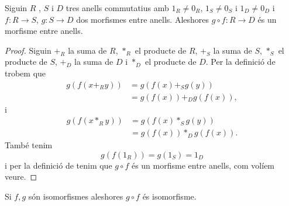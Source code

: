 \documentclass[../../Main.tex]{subfiles}
\begin{document}
	\begin{proposition}
		\label{prop:operació morfismes entre anells és morfisme entre anells}
		Siguin \(R\) , \(S\) i \(D\) tres anells commutatius amb \(1_{R}\neq0_{R}\), \(1_{S}\neq0_{S}\) i \(1_{D}\neq0_{D}\) i \(f\colon R\longrightarrow S\), \(g\colon S\longrightarrow D\) dos morfismes entre anells.
		Aleshores \(g\circ f\colon R\longrightarrow D\) és un morfisme entre anells.
		\begin{proof}
			Siguin \(+_{R}\) la suma de \(R\), \(\ast_{R}\) el producte de \(R\), \(+_{S}\) la suma de \(S\), \(\ast_{S}\) el producte de \(S\), \(+_{D}\) la suma de \(D\) i \(\ast_{D}\) el producte de \(D\). Per la definició de  trobem que
			\begin{align*}
			g(f(x+_{R}y))&=g(f(x)+_{S}g(y))\\
			&=g(f(x))+_{D}g(f(x)),
			\end{align*}
			i
			\begin{align*}
			g(f(x\ast_{R}y))&=g(f(x)\ast_{S}g(y))\\
			&=g(f(x))\ast_{D}g(f(x)).
			\end{align*}
			També tenim
			\[g(f(1_{R}))=g(1_{S})=1_{D}\]
			i per la definició de  tenim que \(g\circ f\) és un morfisme entre anells, com volíem veure.
		\end{proof}
	\end{proposition}
	\begin{corollary}
		\label{corollary:conjugació isomorfismes enre anells és isomorfisme entre anells}
		Si \(f,g\) són isomorfismes aleshores \(g\circ f\) és isomorfisme.
	\end{corollary}
\end{document}
